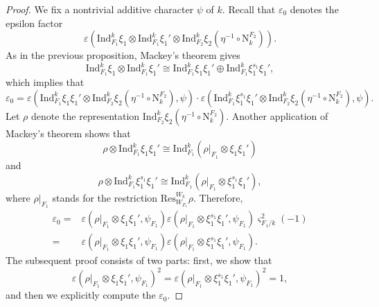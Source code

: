 \documentclass[12pt]{amsart}
\newcommand{\N}{{\mathrm{N}}}
\newcommand{\Res}{{\mathrm{Res}}}
\theoremstyle{Theorem}
\theoremstyle{Theorem}
\theoremstyle{Theorem}
\theoremstyle{Theorem}
\theoremstyle{Plain}
\theoremstyle{remark}
\theoremstyle{remark}
\theoremstyle{Definition}
\begin{document}
\begin{proof}
    We fix a nontrivial additive character $\psi$ of $k$. Recall that $\varepsilon_0$ denotes the epsilon factor
    \[
        \varepsilon \left( \mathrm{Ind}^k_{ F_1 }  \xi_1 \otimes \mathrm{Ind}^k_{ F_1 } \xi_1' \otimes \mathrm{Ind}^k_{ F_2 } \xi_2 \left( \eta^{-1} \circ \mathrm{N}^{ F_2 }_k \right) \right).
    \]
    As in the previous proposition, Mackey's theorem gives
    \[
        \mathrm{Ind}^k_{ F_1 } \xi_1 \otimes \mathrm{Ind}^k_{ F_1 } \xi_1' \cong \mathrm{Ind}^k_{ F_1 } \xi_1 \xi_1' \oplus \mathrm{Ind}^k_{ F_1 } \xi_1^{ s_1 } \xi_1',
    \]
    which implies that
    \[
        \varepsilon_0 = \varepsilon \left( \mathrm{Ind}^k_{ F_1 } \xi_1 \xi_1' \otimes \mathrm{Ind}^k_{ F_2 } \xi_2 \left( \eta^{-1} \circ \N^{F_2}_k \right), \psi \right) \cdot \varepsilon \left( \mathrm{Ind}^k_{ F_1 } \xi_1^{ s_1 } \xi_1' \otimes \mathrm{Ind}^k_{ F_2 } \xi_2 \left( \eta^{-1} \circ \N^{F_2}_k \right), \psi \right).
    \]
    Let $\rho$ denote the representation $ \mathrm{Ind}^k_{ F_2 } \xi_2 \left( \eta^{-1} \circ \mathrm{N}^{ F_2 }_k \right) $. Another application of Mackey's theorem shows that
    \[
        \rho \otimes \mathrm{Ind}^k_{ F_1 } \xi_1 \xi_1' \cong \mathrm{Ind}^k_{ F_1 } \left( \rho|_{ F_1 } \otimes \xi_1 \xi_1' \right)
    \]
    and
    \[
        \rho \otimes \mathrm{Ind}^k_{ F_1 } \xi_1^{ s_1 } \xi_1' \cong \mathrm{Ind}^k_{ F_1 } \left( \rho|_{ F_1 } \otimes \xi_1^{ s_1 } \xi_1' \right),
    \]
    where $ \rho|_{ F_1 } $ stands for the restriction $ \Res^{ W_k }_{ W_{ F_1 } } \rho $. Therefore,
    \[
        \begin{aligned}
            \varepsilon_0 =& \varepsilon \left( \rho|_{ F_1 } \otimes \xi_1 \xi_1', \psi_{ F_1 } \right) \varepsilon \left( \rho|_{ F_1 } \otimes \xi_1^{ s_1 } \xi_1', \psi_{ F_1 } \right) \varsigma_{ F_1/k }^2 (-1)        \\
                          =& \varepsilon \left( \rho|_{ F_1 } \otimes \xi_1 \xi_1', \psi_{ F_1 } \right) \varepsilon \left( \rho|_{ F_1 } \otimes \xi_1^{ s_1 }\xi_1', \psi_{ F_1 } \right).
        \end{aligned}
    \]
    The subsequent proof consists of two parts: first, we  show that
    \[
        \varepsilon \left( \rho|_{ F_1 } \otimes \xi_1 \xi_1', \psi_{ F_1 } \right)^2 = \varepsilon \left( \rho|_{ F_1 } \otimes \xi_1^{ s_1 } \xi_1', \psi_{ F_1 } \right)^2 = 1,
    \]
    and then we explicitly compute the $ \varepsilon_0 $.


\end{proof}
\end{document}
